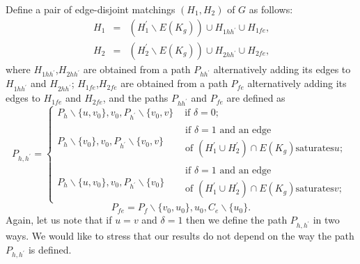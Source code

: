 \documentclass[fleqn,12pt,twoside]{article}
\newenvironment{proof}[1][Proof.]{\begin{trivlist}
\item[\hskip \labelsep {\bfseries #1}]}{\end{trivlist}}
\begin{document}
\begin{proof}
Define a pair of edge-disjoint matchings $\left( H_{1},H_{2}\right)
$ of $G$ as follows:
\begin{eqnarray*}
H_{1} &=&(H_{1}^{\prime }\backslash E(K_{g}))\cup H_{1hh^{\prime
}}\cup
H_{1fe}\text{,} \\
H_{2} &=&(H_{2}^{\prime }\backslash E(K_{g}))\cup H_{2hh^{\prime
}}\cup H_{2fe}\text{,}
\end{eqnarray*}where $H_{1hh^{\prime }}$,$H_{2hh^{\prime }}$ are obtained from a path $P_{hh^{\prime }}$ alternatively adding its edges to $H_{1hh^{\prime }}$ and $H_{2hh^{\prime }}$; $H_{1fe}$,$H_{2fe}$ are obtained from a path
$P_{fe}$
alternatively adding its edges to $H_{1fe}$ and $H_{2fe}$, and the paths $P_{hh^{\prime }}$ and $P_{fe}$ are defined as
\begin{equation*}
P_{h,h^{\prime }}=\left\{
\begin{array}{ll}
P_{h}\backslash \{u,v_{0}\},v_{0},P_{h^{\prime }}\backslash
\{v_{0},v\} &
\text{ if }\delta =0\text{;} \\
P_{h}\backslash \{v_{0}\},v_{0},P_{h^{\prime }}\backslash
\{v_{0},v\} &
\begin{array}{l}
\text{if }\delta =1\text{ and an edge } \\
\text{of }(H_{1}^{\prime }\cup H_{2}^{\prime })\cap E(K_{g})\text{
saturates
}u\text{;}\end{array}
\\
P_{h}\backslash \{u,v_{0}\},v_{0},P_{h^{\prime }}\backslash
\{v_{0}\} &
\begin{array}{l}
\text{if }\delta =1\text{ and an edge } \\
\text{of }(H_{1}^{\prime }\cup H_{2}^{\prime })\cap E(K_{g})\text{
saturates
}v\text{;}\end{array}\end{array}\right.
\end{equation*}\begin{equation*}
P_{fe}=P_{f}\backslash \{v_{0},u_{0}\},u_{0},C_{e}\backslash \{u_{0}\}\text{.}
\end{equation*}Again, let us note that if $u=v$ and $\delta =1$ then we define the
path $P_{h,h^{\prime }}$ in two ways. We would like to stress that
our results do not depend on the way the path $P_{h,h^{\prime }}$ is
defined.


\end{proof}
\end{document}
